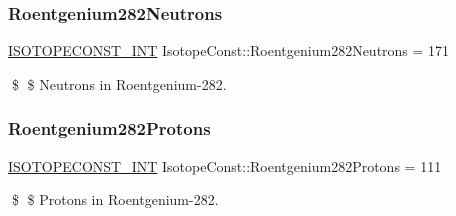 \subsubsection{\texorpdfstring{Roentgenium282\+Neutrons}{Roentgenium282Neutrons}}
{\footnotesize\ttfamily \mbox{\hyperlink{group___isotope_const-_macros_ga5f18360b3e99483a35c32d789e62621c}{I\+S\+O\+T\+O\+P\+E\+C\+O\+N\+S\+T\+\_\+\+I\+NT}} Isotope\+Const\+::\+Roentgenium282\+Neutrons = 171}

\$ \$ Neutrons in Roentgenium-\/282. \mbox{\label{group___isotope_const-_roentgenium-_rg282_gab03ac541d3d10ab48d29d9adcd75eb19}} 
\subsubsection{\texorpdfstring{Roentgenium282\+Protons}{Roentgenium282Protons}}
{\footnotesize\ttfamily \mbox{\hyperlink{group___isotope_const-_macros_ga5f18360b3e99483a35c32d789e62621c}{I\+S\+O\+T\+O\+P\+E\+C\+O\+N\+S\+T\+\_\+\+I\+NT}} Isotope\+Const\+::\+Roentgenium282\+Protons = 111}

\$ \$ Protons in Roentgenium-\/282. 